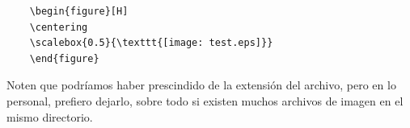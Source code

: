 \documentclass[letterpaper,11pt]{article}
\begin{document}
\begin{lstlisting}
	\begin{figure}[H]
	\centering
	\scalebox{0.5}{\texttt{[image: test.eps]}}	
	\end{figure}
\end{lstlisting}

Noten que podríamos haber prescindido de la extensión del archivo, pero en lo personal, prefiero dejarlo, sobre todo si existen muchos archivos de imagen en el mismo directorio.





 
\end{document}
